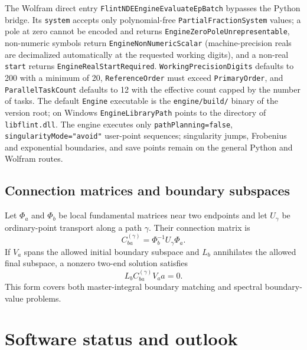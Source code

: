 \documentclass[11pt]{article}
\renewcommand{\_}{\origunderscore\allowbreak}
\begin{document}
The Wolfram direct entry
\texttt{FlintNDE}\allowbreak\texttt{Engine}\allowbreak\texttt{Evaluate}\allowbreak\texttt{EpBatch}
bypasses the Python bridge.  Its \texttt{system} accepts only polynomial-free
\texttt{PartialFractionSystem} values; a pole at zero cannot be encoded and returns
\texttt{EngineZeroPoleUnrepresentable}, non-numeric symbols return
\texttt{EngineNonNumericScalar} (machine-precision reals are decimalized automatically at
the requested working digits), and a non-real \texttt{start} returns
\texttt{EngineRealStartRequired}.
\texttt{WorkingPrecisionDigits} defaults to 200 with a minimum of 20,
\texttt{ReferenceOrder} must exceed \texttt{PrimaryOrder}, and \texttt{ParallelTaskCount}
defaults to 12 with the effective count capped by the number of tasks.  The default
\texttt{Engine} executable is the \texttt{engine/build/} binary of the version root; on
Windows \texttt{EngineLibraryPath} points to the directory of \texttt{libflint.dll}.  The
engine executes only \texttt{pathPlanning=false}, \texttt{singularityMode="avoid"}
user-point sequences; singularity jumps, Frobenius and exponential boundaries, and save
points remain on the general Python and Wolfram routes.

\subsection{Connection matrices and boundary subspaces}

Let $\Phi_a$ and $\Phi_b$ be local fundamental matrices near two endpoints and let
$U_\gamma$ be ordinary-point transport along a path $\gamma$.  Their connection matrix is
\begin{equation}
  C_{ba}^{(\gamma)}=\Phi_b^{-1}U_\gamma\Phi_a.
\end{equation}
If $V_a$ spans the allowed initial boundary subspace and $L_b$ annihilates the allowed final
subspace, a nonzero two-end solution satisfies
\begin{equation}
  L_b C_{ba}^{(\gamma)}V_a a=0.
  \label{eq:two-end-condition}
\end{equation}
This form covers both master-integral boundary matching and spectral boundary-value
problems.

\section{Software status and outlook}
\end{document}
